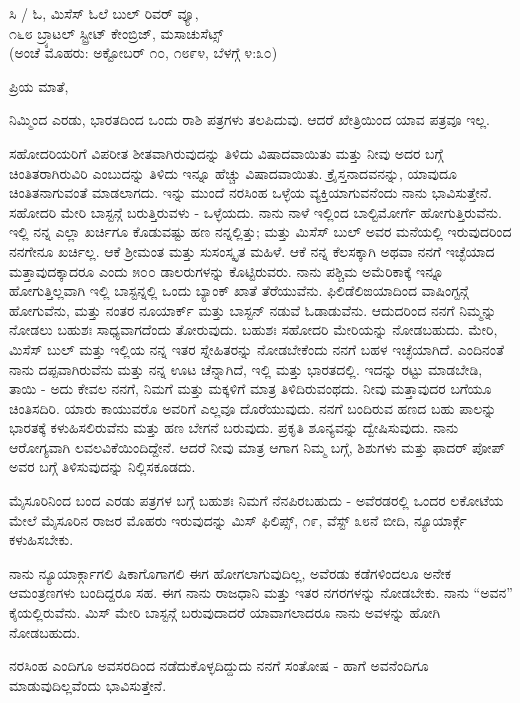 \begin{flushright}
ಸಿ / ಓ, ಮಿಸೆಸ್ ಓಲೆ ಬುಲ್ ರಿವರ್ ವ್ಯೂ,\\೧೬೮ ಬ್ರ್ಯಾಟಲ್ ಸ್ಟ್ರೀಟ್ ಕೇಂಬ್ರಿಜ್, ಮಸಾಚುಸೆಟ್ಸ್\\(ಅಂಚೆ ಮೊಹರು: ಅಕ್ಟೋಬರ್ ೧೦, ೧೮೯೪, ಬೆಳಗ್ಗೆ ೪:೩೦)
\end{flushright}

ಪ್ರಿಯ ಮಾತೆ,

ನಿಮ್ಮಿಂದ ಎರಡು, ಭಾರತದಿಂದ ಒಂದು ರಾಶಿ ಪತ್ರಗಳು ತಲಪಿದುವು. ಆದರೆ ಖೇತ್ರಿಯಿಂದ ಯಾವ ಪತ್ರವೂ ಇಲ್ಲ.

ಸಹೋದರಿಯರಿಗೆ ವಿಪರೀತ ಶೀತವಾಗಿರುವುದನ್ನು ತಿಳಿದು ವಿಷಾದವಾಯಿತು ಮತ್ತು ನೀವು ಅದರ ಬಗ್ಗೆ ಚಿಂತಿತರಾಗಿರುವಿರಿ ಎಂಬುದನ್ನು ತಿಳಿದು ಇನ್ನೂ ಹೆಚ್ಚು ವಿಷಾದವಾಯಿತು. ಕ್ರೈಸ್ತನಾದವನನ್ನು, ಯಾವುದೂ ಚಿಂತಿತನಾಗುವಂತೆ ಮಾಡಲಾಗದು. ಇನ್ನು ಮುಂದೆ ನರಸಿಂಹ ಒಳ್ಳೆಯ ವ್ಯಕ್ತಿಯಾಗುವನೆಂದು ನಾನು ಭಾವಿಸುತ್ತೇನೆ. ಸಹೋದರಿ ಮೇರಿ ಬಾಸ್ಟನ್ಗೆ ಬರುತ್ತಿರುವಳು - ಒಳ್ಳೆಯದು. ನಾನು ನಾಳೆ ಇಲ್ಲಿಂದ ಬಾಲ್ಟಿಮೋರ್ಗೆ ಹೋಗುತ್ತಿರುವೆನು. ಇಲ್ಲಿ ನನ್ನ ಎಲ್ಲಾ ಖರ್ಚಿಗೂ ಕೊಡುವಷ್ಟು ಹಣ ನನ್ನಲ್ಲಿತ್ತು; ಮತ್ತು ಮಿಸೆಸ್ ಬುಲ್ ಅವರ ಮನೆಯಲ್ಲಿ ಇರುವುದರಿಂದ ನನಗೇನೂ ಖರ್ಚಿಲ್ಲ. ಆಕೆ ಶ‍್ರೀಮಂತ ಮತ್ತು ಸುಸಂಸ್ಕೃತ ಮಹಿಳೆ. ಆಕೆ ನನ್ನ ಕೆಲಸಕ್ಕಾಗಿ ಅಥವಾ ನನಗೆ ಇಚ್ಛೆಯಾದ ಮತ್ತಾವುದಕ್ಕಾದರೂ ಎಂದು ೫೦೦ ಡಾಲರುಗಳನ್ನು ಕೊಟ್ಟಿರುವರು. ನಾನು ಪಶ್ಚಿಮ ಅಮೆರಿಕಾಕ್ಕೆ ಇನ್ನೂ ಹೋಗುತ್ತಿಲ್ಲವಾಗಿ ಇಲ್ಲಿ ಬಾಸ್ಟನ್ನಲ್ಲಿ ಒಂದು ಬ್ಯಾಂಕ್ ಖಾತೆ ತೆರೆಯುವೆನು. ಫಿಲಿಡೆಲಿಙಯಾದಿಂದ ವಾಷಿಂಗ್ಟನ್ಗೆ ಹೋಗುವೆನು, ಮತ್ತು ನಂತರ ನೂಯಾರ್ಕ್ ಮತ್ತು ಬಾಸ್ಟನ್ ನಡುವೆ ಓಡಾಡುವೆನು. ಆದುದರಿಂದ ನನಗೆ ನಿಮ್ಮನ್ನು ನೋಡಲು ಬಹುಶಃ ಸಾಧ್ಯವಾಗದೆಂದು ತೋರುವುದು. ಬಹುಶಃ ಸಹೋದರಿ ಮೇರಿಯನ್ನು ನೋಡಬಹುದು. ಮೇರಿ, ಮಿಸೆಸ್ ಬುಲ್ ಮತ್ತು ಇಲ್ಲಿಯ ನನ್ನ ಇತರ ಸ್ನೇಹಿತರನ್ನು ನೋಡಬೇಕೆಂದು ನನಗೆ ಬಹಳ ಇಚ್ಛೆಯಾಗಿದೆ. ಎಂದಿನಂತೆ ನಾನು ದಪ್ಪವಾಗಿರುವೆನು ಮತ್ತು ನನ್ನ ಊಟ ಚೆನ್ನಾಗಿದೆ, ಇಲ್ಲಿ ಮತ್ತು ಭಾರತದಲ್ಲಿ. ಇದನ್ನು ರಟ್ಟು ಮಾಡಬೇಡಿ, ತಾಯಿ - ಅದು ಕೇವಲ ನನಗೆ, ನಿಮಗೆ ಮತ್ತು ಮಕ್ಕಳಿಗೆ ಮಾತ್ರ ತಿಳಿದಿರುವಂಥದು. ನೀವು ಮತ್ತಾವುದರ ಬಗೆಯೂ ಚಿಂತಿಸದಿರಿ. ಯಾರು ಕಾಯುವರೊ ಅವರಿಗೆ ಎಲ್ಲವೂ ದೊರೆಯುವುದು. ನನಗೆ ಬಂದಿರುವ ಹಣದ ಬಹು ಪಾಲನ್ನು ಭಾರತಕ್ಕೆ ಕಳುಹಿಸಲಿರುವೆನು ಮತ್ತು ಹಣ ಬೇಗನೆ ಬರುವುದು. ಪ್ರಕೃತಿ ಶೂನ್ಯವನ್ನು ದ್ವೇಷಿಸುವುದು. ನಾನು ಆರೋಗ್ಯವಾಗಿ ಲವಲವಿಕೆಯಿಂದಿದ್ದೇನೆ. ಆದರೆ ನೀವು ಮಾತ್ರ ಆಗಾಗ ನಿಮ್ಮ ಬಗ್ಗೆ, ಶಿಶುಗಳು ಮತ್ತು ಫಾದರ್ ಪೋಪ್ ಅವರ ಬಗ್ಗೆ ತಿಳಿಸುವುದನ್ನು ನಿಲ್ಲಿಸಕೂಡದು.

ಮೈಸೂರಿನಿಂದ ಬಂದ ಎರಡು ಪತ್ರಗಳ ಬಗ್ಗೆ ಬಹುಶಃ ನಿಮಗೆ ನೆನಪಿರಬಹುದು - ಅವೆರಡರಲ್ಲಿ ಒಂದರ ಲಕೋಟೆಯ ಮೇಲೆ ಮೈಸೂರಿನ ರಾಜರ ಮೊಹರು ಇರುವುದನ್ನು ಮಿಸ್ ಫಿಲಿಪ್ಸ್, ೧೯, ವೆಸ್ಟ್ ೩೮ನೆ ಬೀದಿ, ನ್ಯೂಯಾರ್ಕ್ಗೆ ಕಳುಹಿಸಬೇಕು.

ನಾನು ನ್ಯೂಯಾರ್ಕ್ಗಾಗಲಿ ಷಿಕಾಗೊಗಾಗಲಿ ಈಗ ಹೋಗಲಾಗುವುದಿಲ್ಲ, ಅವೆರಡು ಕಡೆಗಳಿಂದಲೂ ಅನೇಕ ಆಮಂತ್ರಣಗಳು ಬಂದಿದ್ದರೂ ಸಹ. ಈಗ ನಾನು ರಾಜಧಾನಿ ಮತ್ತು ಇತರ ನಗರಗಳನ್ನು ನೋಡಬೇಕು. ನಾನು “ಅವನ” ಕೈಯಲ್ಲಿರುವೆನು. ಮಿಸ್ ಮೇರಿ ಬಾಸ್ಟನ್ಗೆ ಬರುವುದಾದರೆ ಯಾವಾಗಲಾದರೂ ನಾನು ಅವಳನ್ನು ಹೋಗಿ ನೋಡಬಹುದು.

ನರಸಿಂಹ ಎಂದಿಗೂ ಅವಸರದಿಂದ ನಡೆದುಕೊಳ್ಳದಿದ್ದುದು ನನಗೆ ಸಂತೋಷ - ಹಾಗೆ ಅವನೆಂದಿಗೂ ಮಾಡುವುದಿಲ್ಲವೆಂದು ಭಾವಿಸುತ್ತೇನೆ.

